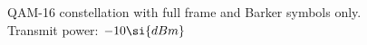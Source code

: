 \begin{figure} [htbp]
    \centering
  \caption{QAM-16 constellation with full frame and Barker symbols only. Transmit power: $\measPWR \si{dBm}$}
  \label{fig:QAMBarker} 
\end{figure}
